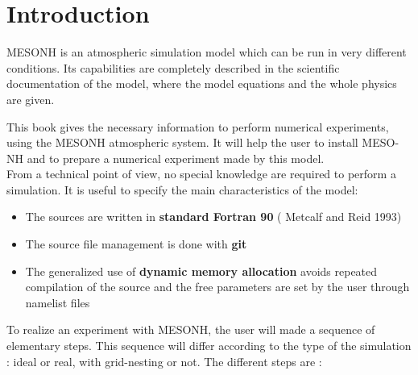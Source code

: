 \chapter{ Introduction}

\indent MESONH is an atmospheric simulation model which can be run in very different
conditions. Its capabilities are completely described in the scientific
documentation of the model, where the model equations and the whole
physics are given.  

This book gives the  necessary information to perform
numerical experiments, using the MESONH atmospheric system. 
It will help the user to install MESO-NH and to prepare 
a numerical experiment made by this model.\\

From a technical point of view, no special knowledge are required to perform a
simulation. It is useful to specify the main characteristics of
the model: 
\begin{itemize}
\item
The sources are written in {\bf standard Fortran 90} ( Metcalf and Reid 1993)
\item
The source file management is done with {\bf git }
\item
The generalized use of {\bf  dynamic memory allocation} avoids  repeated 
compilation of the source and the free parameters are set by the user
 through namelist files
\end{itemize}

To realize an experiment with MESONH, the user will made a sequence of elementary steps. This sequence will differ according to the type of the simulation : ideal or real, with grid-nesting or not. The different steps  are :

